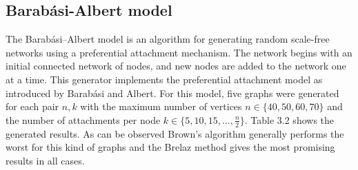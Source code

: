 \subsection{Barabási-Albert model}
The Barabási–Albert model is an algorithm for generating random scale-free networks using a preferential attachment mechanism. The network begins with an initial connected network of nodes, and new nodes are added to the network one at a time. This generator implements the preferential attachment model as introduced by Barabási and Albert.
For this model, five graphs were generated for each pair $n, k$ with the maximum number of vertices $n \in \{40, 50, 60, 70\}$ and the number of attachments per node $k \in \{5, 10, 15, \dots, \frac{n}{2}\}$. Table 3.2 shows the generated results. As can be observed Brown's algorithm generally performs the worst for this kind of graphs and the Brelaz method gives the most promising results in all cases. 

